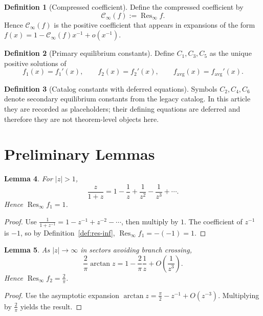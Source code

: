 \documentclass[11pt]{article}
\theoremstyle{definition}
\newtheorem{definition}{Definition}[section]
\theoremstyle{plain}
\newtheorem{lemma}[definition]{Lemma}
\begin{document}
\begin{definition}[Compressed coefficient]
\label{def:compressed}
Define the compressed coefficient by
\[
\mathcal C_{\infty}(f):=\operatorname{Res}_{\infty} f.
\]
Hence \(\mathcal C_{\infty}(f)\) is the positive coefficient that appears in expansions of the form
\(f(x)=1-\mathcal C_{\infty}(f)x^{-1}+o(x^{-1})\).
\end{definition}

\begin{definition}[Primary equilibrium constants]
\label{def:primary}
Define \(C_1,C_3,C_5\) as the unique positive solutions of
\[
f_1(x)=f_1'(x),\qquad f_2(x)=f_2'(x),\qquad f_{\mathrm{avg}}(x)=f_{\mathrm{avg}}'(x).
\]
\end{definition}

\begin{definition}[Catalog constants with deferred equations]
\label{def:deferred}
Symbols \(C_2,C_4,C_6\) denote secondary equilibrium constants from the legacy catalog.
In this article they are recorded as placeholders; their defining equations are deferred and therefore they are not theorem-level objects here.
\end{definition}

\section{Preliminary Lemmas}
\begin{lemma}
\label{lem:f1-expansion}
For \(|z|>1\),
\[
\frac{z}{1+z}=1-\frac{1}{z}+\frac{1}{z^2}-\frac{1}{z^3}+\cdots.
\]
Hence \(\operatorname{Res}_{\infty} f_1=1\).
\end{lemma}
\begin{proof}
Use \(\frac{1}{1+z^{-1}}=1-z^{-1}+z^{-2}-\cdots\), then multiply by \(1\).
The coefficient of \(z^{-1}\) is \(-1\), so by Definition~\ref{def:res-inf},
\(\operatorname{Res}_{\infty} f_1=-(-1)=1\).
\end{proof}

\begin{lemma}
\label{lem:f2-expansion}
As \(|z|\to\infty\) in sectors avoiding branch crossing,
\[
\frac{2}{\pi}\arctan z = 1-\frac{2}{\pi}\frac{1}{z}+O\!\left(\frac{1}{z^3}\right).
\]
Hence \(\operatorname{Res}_{\infty} f_2=\frac{2}{\pi}\).
\end{lemma}
\begin{proof}
Use the asymptotic expansion \(\arctan z=\frac{\pi}{2}-z^{-1}+O(z^{-3})\).
Multiplying by \(\frac{2}{\pi}\) yields the result.
\end{proof}
\end{document}
